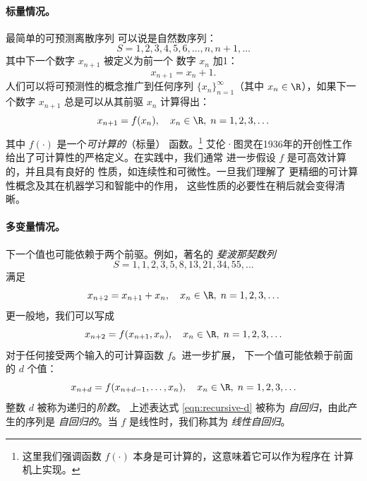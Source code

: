 \documentclass[../../book-main_zh.tex]{subfiles}
\begin{document}
\paragraph{标量情况。} 最简单的可预测离散序列
可以说是自然数序列：
\begin{equation}
    S = 1, 2, 3, 4, 5, 6, \ldots, n, n+1, \ldots
\end{equation}
其中下一个数字 \(x_{n+1}\) 被定义为前一个
数字 \(x_{n}\) 加1：
\begin{equation}
    x_{n+1} = x_{n} + 1.
\end{equation}
人们可以将可预测性的概念推广到任何序列
\(\{x_{n}\}_{n=1}^{\infty}\)（其中 \(x_{n} \in \R\)），如果下一个数字
\(x_{n+1}\) 总是可以从其前驱 \(x_{n}\) 计算得出：
\begin{equation}
    x_{n+1} = f(x_{n}), \quad x_{n} \in \R, \; n = 1, 2, 3, \ldots
\end{equation}
其中 \(f(\cdot)\) 是一个\textit{可计算的}（标量）
函数。\footnote{这里我们强调函数 \(f(\cdot)\)
    本身是可计算的，这意味着它可以作为程序在
计算机上实现。} 艾伦·图灵在1936年的开创性工作 \cite{Turing-1936}
给出了可计算性的严格定义。在实践中，我们通常
进一步假设 \(f\) 是可高效计算的，并且具有良好的
性质，如连续性和可微性。一旦我们理解了
更精细的可计算性概念及其在机器学习和智能中的作用，
这些性质的必要性在稍后就会变得清晰。

\paragraph{多变量情况。}
下一个值也可能依赖于两个前驱。例如，著名的
\textit{斐波那契数列}
\begin{equation}
    S = 1, 1, 2, 3, 5, 8, 13, 21, 34, 55, \ldots
\end{equation}
满足
\begin{equation}
    x_{n+2} = x_{n+1} + x_{n}, \quad x_{n} \in \R, \; n = 1, 2, 3, \ldots
\end{equation}
更一般地，我们可以写成
\begin{equation}
    x_{n+2} = f(x_{n+1}, x_{n}), \quad x_{n} \in \R, \; n = 1, 2, 3, \ldots
\end{equation}
对于任何接受两个输入的可计算函数 \(f\)。进一步扩展，
下一个值可能依赖于前面的 \(d\) 个值：
\begin{equation}
    x_{n+d} = f(x_{n+d-1}, \ldots, x_{n}), \quad x_{n} \in \R, \; n =
    1, 2, 3, \ldots
    \label{eqn:recursive-d}
\end{equation}
整数 \(d\) 被称为递归的\textit{阶数}。
上述表达式 \eqref{eqn:recursive-d} 被称为
\textit{自回归}，由此产生的序列是
\textit{自回归的}。当 \(f\) 是线性时，我们称其为
\textit{线性自回归}。
\end{document}
